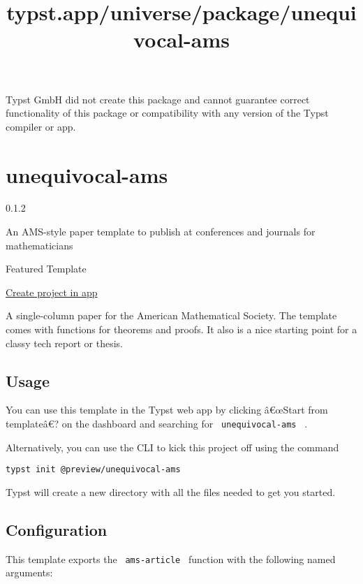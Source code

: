 Typst GmbH did not create this package and cannot guarantee correct
functionality of this package or compatibility with any version of the
Typst compiler or app.


\title{typst.app/universe/package/unequivocal-ams}

\label{banner}
\label{template-thumbnail}

\section{unequivocal-ams}\label{unequivocal-ams}

{ 0.1.2 }

An AMS-style paper template to publish at conferences and journals for
mathematicians

{ } Featured Template

\href{/app?template=unequivocal-ams&version=0.1.2}{Create project in
app}

\label{readme}
A single-column paper for the American Mathematical Society. The
template comes with functions for theorems and proofs. It also is a nice
starting point for a classy tech report or thesis.

\subsection{Usage}\label{usage}

You can use this template in the Typst web app by clicking â€œStart from
templateâ€? on the dashboard and searching for
\texttt{\ unequivocal-ams\ } .

Alternatively, you can use the CLI to kick this project off using the
command

\begin{verbatim}
typst init @preview/unequivocal-ams
\end{verbatim}

Typst will create a new directory with all the files needed to get you
started.

\subsection{Configuration}\label{configuration}

This template exports the \texttt{\ ams-article\ } function with the
following named arguments:


